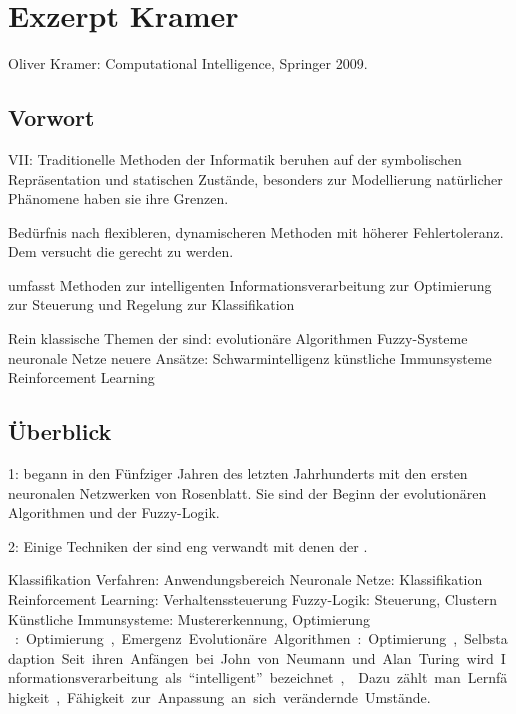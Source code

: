 \chapter{Exzerpt Kramer}

Oliver Kramer: Computational Intelligence, Springer 2009.

\section{Vorwort} %

VII: Traditionelle Methoden der Informatik beruhen auf der
symbolischen Repräsentation und statischen Zustände,
besonders zur Modellierung natürlicher Phänomene haben sie
ihre Grenzen.

Bedürfnis nach flexibleren, dynamischeren Methoden mit
höherer Fehlertoleranz. Dem versucht die \CI{} gerecht zu
werden.

\CI{} umfasst Methoden zur
    intelligenten Informationsverarbeitung
    zur Optimierung
    zur Steuerung und Regelung
    zur Klassifikation

Rein klassische Themen der \CI{} sind:
    evolutionäre Algorithmen
    Fuzzy-Systeme
    neuronale Netze
neuere Ansätze:
    Schwarmintelligenz
    künstliche Immunsysteme
    Reinforcement Learning

\section{Überblick \CI{}} %

1: \CI{} begann in den Fünfziger Jahren des letzten
Jahrhunderts mit den ersten neuronalen Netzwerken von
Rosenblatt. Sie sind der Beginn der evolutionären
Algorithmen und der Fuzzy-Logik.

2: Einige Techniken der \CI{} sind eng verwandt mit denen
der \AI{}. 

Klassifikation Verfahren: Anwendungsbereich
    Neuronale Netze: Klassifikation
    Reinforcement Learning: Verhaltenssteuerung
    Fuzzy-Logik: Steuerung, Clustern
    Künstliche Immunsysteme: Mustererkennung, Optimierung
    \SI{}: Optimierung, Emergenz
    Evolutionäre Algorithmen: Optimierung, Selbstadaption.

Seit ihren Anfängen bei John von Neumann und Alan Turing
wird Informationsverarbeitung als \enquote{intelligent}
bezeichnet, 
. Dazu zählt man Lernfähigkeit,
Fähigkeit zur Anpassung an sich verändernde Umstände.

